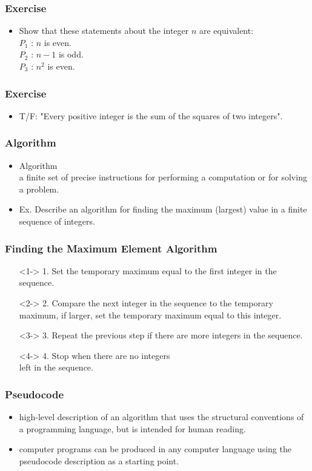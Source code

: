 \documentclass{beamer}
\begin{document}
\begin{frame}
\frametitle{\HandRightUp Exercise}
\begin{itemize} 
\Large
\item <1-> Show that these statements about the integer $n$ are equivalent:\\
$P_1$ : $n$ is even. \\
$P_2$ : $n - 1$ is odd. \\
$P_3$ : $n^2$ is even.
\end{itemize}
\end{frame}  


\begin{frame}
\frametitle{\HandRightUp Exercise}
\begin{itemize} 
\Large
\item <1-> T/F: "Every positive integer is the sum of the squares of two integers".
\end{itemize}
\end{frame} 


\begin{frame}
\frametitle{Algorithm}
\begin{itemize} 
\Large
\item <2-> Algorithm \\
a finite set of precise instructions for performing a computation or for solving a problem.
\item <3-> Ex. Describe an algorithm for finding the maximum (largest) value in a finite sequence of integers. 
\end{itemize}
\end{frame} 


\begin{frame}
\frametitle{\huge Finding the Maximum Element Algorithm}
\begin{itemize} 
\Large
\item[]  <1-> 1. Set the temporary maximum equal to the first integer in the sequence. 
\item[]  <2-> 2. Compare the next integer in the sequence to the temporary maximum, if larger, set the temporary maximum equal to this integer. 
\item[]  <3-> 3. Repeat the previous step if there are more integers in the sequence.
\item[]  <4-> 4. Stop when there are no integers \\ left in the sequence. 
\end{itemize}
\end{frame} 


\begin{frame}
\frametitle{\huge Pseudocode}
\begin{itemize} 
\Large
\item <1-> high-level description of an algorithm that uses the structural conventions of a programming language, but is intended for human reading.
\item <2-> computer programs can be produced in any computer language using the pseudocode description as a starting point.
\end{itemize}
\end{frame} 
\end{document}
